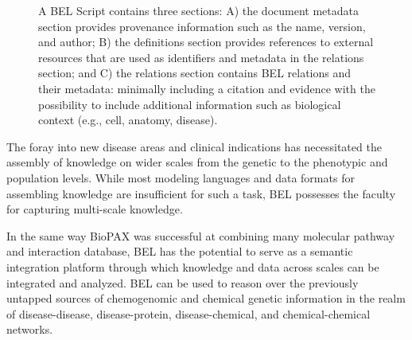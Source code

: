 \begin{figure}
    \captionsetup{format=plain}
    \caption[The Schema of a BEL Script]{A BEL Script contains three sections: A) the document metadata section provides provenance information such as the name, version, and author; B) the definitions section provides references to external resources that are used as identifiers and metadata in the relations section; and C) the relations section contains BEL relations and their metadata: minimally including a citation and evidence with the possibility to include additional information such as biological context (e.g., cell, anatomy, disease).}
    \label{fig:bel_script}
\end{figure}

The foray into new disease areas and clinical indications has necessitated the assembly of knowledge on wider scales from the genetic to the phenotypic and population levels.
While most modeling languages and data formats for assembling knowledge are insufficient for such a task, BEL possesses the faculty for capturing multi-scale knowledge.

In the same way \ac{BioPAX} was successful at combining many molecular pathway and interaction database, \ac{BEL} has the potential to serve as a semantic integration platform through which knowledge and data across scales can be integrated and analyzed.
\ac{BEL} can be used to reason over the previously untapped sources of chemogenomic and chemical genetic information in the realm of disease-disease, disease-protein, disease-chemical, and chemical-chemical networks.

